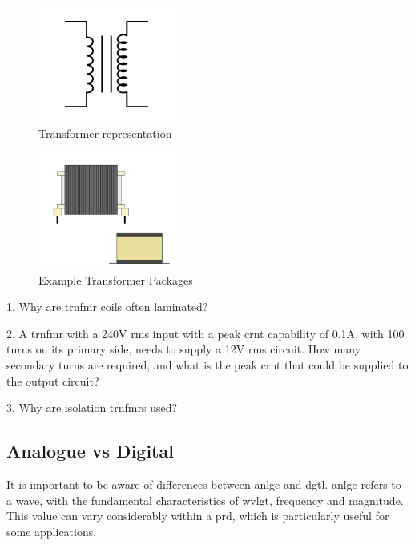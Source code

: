 \documentclass[a4paper,11pt]{report}
\newcommand{\Quiz}[1] %
{
\par\noindent %
\phantomsection %
\todo[inline, color=blue!30]{\textbf{#1}} %
\vspace{1em} %
}
\begin{document}
\begin{figure}[H]
\centering
\includegraphics[width=0.4\textwidth]{Transformer1}
\caption{Transformer representation}
\end{figure}

\begin{figure}[H]
\centering
\includegraphics[width=0.4\textwidth]{TransformerPackages}
\caption{Example Transformer Packages}
\end{figure}

\Quiz{Quiz}

1. Why are \gls{trnfmr} coils often laminated?

2. A \gls{trnfmr} with a 240V \gls{rms} input with a peak \gls{crnt} capability of 0.1A, with 100 turns on its primary side, needs to supply a 12V \gls{rms} circuit. How many secondary turns are required, and what is the peak \gls{crnt} that could be supplied to the output circuit?

3. Why are isolation \gls{trnfmr}s used?

\vspace*{1\baselineskip}

\subsection{Analogue vs Digital}

It is important to be aware of differences between \gls{anlge} and \gls{dgtl}. \gls{anlge} refers to a wave, with the fundamental characteristics of \gls{wvlgt}, frequency and magnitude. This value can vary considerably within a \gls{prd}, which is particularly useful for some applications.
\end{document}
